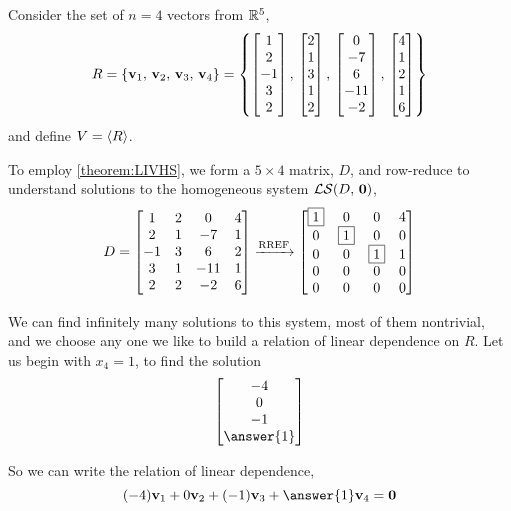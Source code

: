 \documentclass{ximera}
\begin{document}
\begin{example}
  Consider the set of $n=4$ vectors from $\mathbb{R}^{5}$,
  \[
    R=\left\{\mathbf{v}_1,\,\mathbf{v}_2,\,\mathbf{v}_3,\,\mathbf{v}_4\right\}
    =
    \left\{
      \begin{bmatrix}1\\2\\-1\\3\\2\end{bmatrix},\,
      \begin{bmatrix}2\\1\\3\\1\\2\end{bmatrix},\,
      \begin{bmatrix}0\\-7\\6\\-11\\-2\end{bmatrix},\,
      \begin{bmatrix}4\\1\\2\\1\\6\end{bmatrix}
    \right\}
  \]
  and define $V=\left\langle R\right\rangle$.
  
  To employ \ref{theorem:LIVHS}, we form a $5\times 4$ matrix, $D$, and
  row-reduce to understand solutions to the homogeneous system
  $\mathcal{LS}\!\left(D,\,\mathbf{0}\right)$,
  \[
    D=
    \begin{bmatrix}
      1&2&0&4\\
      2&1&-7&1\\
      -1&3&6&2\\
      3&1&-11&1\\
      2&2&-2&6
    \end{bmatrix}
    \xrightarrow{\text{RREF}}
    \begin{bmatrix}
      \fbox{1}&0&0&4\\
      0&\fbox{1}&0&0\\
      0&0&\fbox{1}&1\\
      0&0&0&0\\
      0&0&0&0
    \end{bmatrix}
  \]

  We can find infinitely many solutions to this system, most of them
  nontrivial, and we choose any one we like to build a relation of
  linear dependence on $R$.  Let us begin with $x_4=1$, to find the
  solution
  \[
    \colvector{-4\\0\\-1\\\answer{1}}
  \]

  So we can write the relation of linear dependence,
  \[
    (-4)\vect{v}_1+0\vect{v}_2+(-1)\vect{v}_3+\answer{1}\vect{v}_4=\zerovector
  \]


\end{example}
\end{document}

